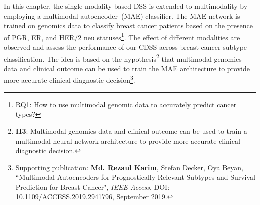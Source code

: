 \hspace*{3.5mm} In this chapter, the single modality-based DSS is extended to multimodality by employing a multimodal autoencoder~(MAE) classifier. The MAE network is trained on genomics data to classify breast cancer patients based on the presence of PGR, ER, and HER/2 neu statuses\footnote{RQ1: How to use multimodal genomic data to accurately predict cancer
types?}. The effect of different modalities are observed and assess the performance of our CDSS across breast cancer subtype classification. The idea is based on the hypothesis\footnote{\textbf{H3}: Multimodal genomics data and clinical outcome can be used to train a multimodal neural network architecture to provide more accurate clinical diagnostic decision.} that multimodal genomics data and clinical outcome can be used to train the MAE architecture to provide more accurate clinical diagnostic decision\footnote{Supporting publication: \textbf{Md. Rezaul Karim}, Stefan Decker, Oya Beyan, ``Multimodal Autoencoders for Prognostically Relevant Subtypes and Survival Prediction for Breast Cancer", \emph{IEEE Access}, DOI: 10.1109/ACCESS.2019.2941796, September 2019.}. %

